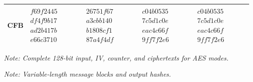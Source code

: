 \begin{table}[!t]
{\begin{tabular}{l|>{\raggedright\arraybackslash}p{2.2cm}|>{\raggedright\arraybackslash}p{2.2cm}|>{\raggedright\arraybackslash}p{2.4cm}|>{\raggedright\arraybackslash}p{2.4cm}}
\midrule
\textbf{CFB} & \texttt{$f69f2445$ \newline $df4f9b17$ \newline $ad2b417b$ \newline $e66c3710$} & \texttt{$26751f67$ \newline $a3cbb140$ \newline $b1808cf1$ \newline $87a4f4df$} & \texttt{$c04b0535$ \newline $7c5d1c0e$ \newline $eac4c66f$ \newline $9ff7f2e6$} & \texttt{$c04b0535$ \newline $7c5d1c0e$ \newline $eac4c66f$ \newline $9ff7f2e6$} \\
\bottomrule
\end{tabular}%
}
\vspace{2pt}
\raggedright
\footnotesize\textit{Note: Complete 128-bit input, IV, counter, and ciphertexts for AES modes.}
\end{table}

\begin{table}[!t]
\centering
\caption{Functional Verification Vectors for SHA-3-256}
\label{tab:sha3_functional_full}
\small
{}
\vspace{2pt}
\raggedright
\footnotesize\textit{Note: Variable-length message blocks and output hashes.}
\end{table}

